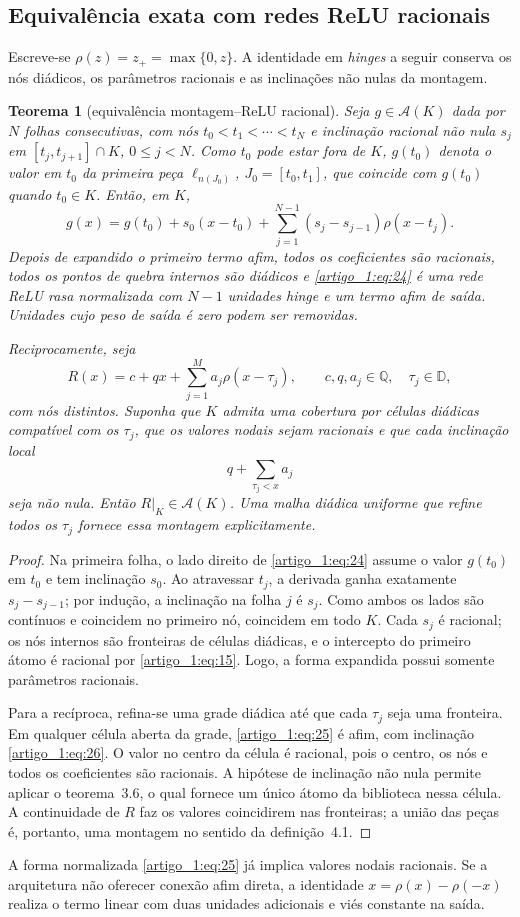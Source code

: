 \documentclass[12pt,a4paper]{article}
\theoremstyle{preciso}
\newtheorem{teorema}{Teorema}[section]
\theoremstyle{definition}
\newcommand{\Q}{\mathbb Q}
\newcommand{\D}{\mathbb D}
\newcommand{\Asm}{\mathcal A}
\newcommand{\eqn}[2]{\begin{equation}\label{eq:#1}#2\end{equation}}
\theoremstyle{preciso}
\theoremstyle{preciso}
\theoremstyle{preciso}
\theoremstyle{preciso}
\theoremstyle{definition}
\theoremstyle{preciso}
\theoremstyle{definition}
\theoremstyle{preciso}
\theoremstyle{preciso}
\theoremstyle{definition}
\begin{document}
\subsection{Equivalência exata com redes ReLU racionais}
Escreve-se $\rho(z)=z_+=\max\{0,z\}$. A identidade em \emph{hinges} a seguir conserva os nós diádicos, os parâmetros racionais e as inclinações não nulas da montagem.
\begin{teorema}[equivalência montagem--ReLU racional]\label{map:artigo_1:4.3}
Seja $g\in\Asm(K)$ dada por $N$ folhas consecutivas, com nós $t_0<t_1<\cdots<t_N$ e inclinação racional não nula $s_j$ em $[t_j,t_{j+1}]\cap K$, $0\le j<N$. Como $t_0$ pode estar fora de $K$, $g(t_0)$ denota o valor em $t_0$ da primeira peça $\ell_{n(J_0)}$, $J_0=[t_0,t_1]$, que coincide com $g(t_0)$ quando $t_0\in K$. Então, em $K$,
\eqn{24}{g(x)=g(t_0)+s_0(x-t_0)+\sum_{j=1}^{N-1}(s_j-s_{j-1})\rho(x-t_j).}
Depois de expandido o primeiro termo afim, todos os coeficientes são racionais, todos os pontos de quebra internos são diádicos e \eqref{artigo_1:eq:24} é uma rede ReLU rasa normalizada com $N-1$ unidades hinge e um termo afim de saída. Unidades cujo peso de saída é zero podem ser removidas.

Reciprocamente, seja
\eqn{25}{R(x)=c+qx+\sum_{j=1}^Ma_j\rho(x-\tau_j),\qquad c,q,a_j\in\Q,\quad\tau_j\in\D,}
com nós distintos. Suponha que $K$ admita uma cobertura por células diádicas compatível com os $\tau_j$, que os valores nodais sejam racionais e que cada inclinação local
\eqn{26}{q+\sum_{\tau_j<x}a_j}
seja não nula. Então $R|_K\in\Asm(K)$. Uma malha diádica uniforme que refine todos os $\tau_j$ fornece essa montagem explicitamente.
\end{teorema}
\begin{proof}
Na primeira folha, o lado direito de \eqref{artigo_1:eq:24} assume o valor $g(t_0)$ em $t_0$ e tem inclinação $s_0$. Ao atravessar $t_j$, a derivada ganha exatamente $s_j-s_{j-1}$; por indução, a inclinação na folha $j$ é $s_j$. Como ambos os lados são contínuos e coincidem no primeiro nó, coincidem em todo $K$. Cada $s_j$ é racional; os nós internos são fronteiras de células diádicas, e o intercepto do primeiro átomo é racional por \eqref{artigo_1:eq:15}. Logo, a forma expandida possui somente parâmetros racionais.

Para a recíproca, refina-se uma grade diádica até que cada $\tau_j$ seja uma fronteira. Em qualquer célula aberta da grade, \eqref{artigo_1:eq:25} é afim, com inclinação \eqref{artigo_1:eq:26}. O valor no centro da célula é racional, pois o centro, os nós e todos os coeficientes são racionais. A hipótese de inclinação não nula permite aplicar o teorema~3.6, o qual fornece um único átomo da biblioteca nessa célula. A continuidade de $R$ faz os valores coincidirem nas fronteiras; a união das peças é, portanto, uma montagem no sentido da definição~4.1.
\end{proof}
A forma normalizada \eqref{artigo_1:eq:25} já implica valores nodais racionais. Se a arquitetura não oferecer conexão afim direta, a identidade $x=\rho(x)-\rho(-x)$ realiza o termo linear com duas unidades adicionais e viés constante na saída.
\end{document}
